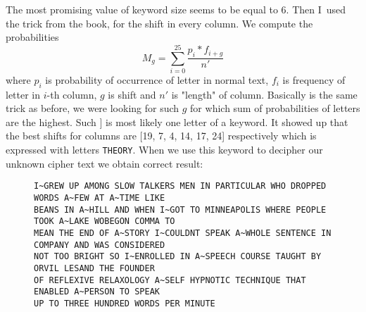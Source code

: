 \documentclass[a4paper,10pt]{article}
\begin{document}
\noindent
The most promising value of keyword size seems to be equal to 6. Then I~used the trick from the book, for the shift in every column. We compute the probabilities
\begin{equation*}
M_g = \sum_{i=0}^{25} \frac{p_i*f_{i+g}}{n'}
\end{equation*}
where $p_i$ is probability of occurrence of letter in normal text, $f_i$ is frequency of letter in $i$-th column, $g$ is shift and  $n'$ is "length" of column. Basically is the same trick as before, we were looking for such $g$ for which sum of probabilities of letters are the highest. Such $]$ is most likely one letter of a keyword. It showed up that the best shifts for columns are [19, 7, 4, 14, 17, 24] respectively which is expressed with letters \texttt{THEORY}. When we use this keyword to decipher our unknown cipher text we obtain correct result:
\begin{figure}[H]
\centering
\begin{BVerbatim}
I~GREW UP AMONG SLOW TALKERS MEN IN PARTICULAR WHO DROPPED WORDS A~FEW AT A~TIME LIKE
BEANS IN A~HILL AND WHEN I~GOT TO MINNEAPOLIS WHERE PEOPLE TOOK A~LAKE WOBEGON COMMA TO
MEAN THE END OF A~STORY I~COULDNT SPEAK A~WHOLE SENTENCE IN COMPANY AND WAS CONSIDERED
NOT TOO BRIGHT SO I~ENROLLED IN A~SPEECH COURSE TAUGHT BY ORVIL LESAND THE FOUNDER
OF REFLEXIVE RELAXOLOGY A~SELF HYPNOTIC TECHNIQUE THAT ENABLED A~PERSON TO SPEAK
UP TO THREE HUNDRED WORDS PER MINUTE
\end{BVerbatim}
\end{figure}
\end{document}
